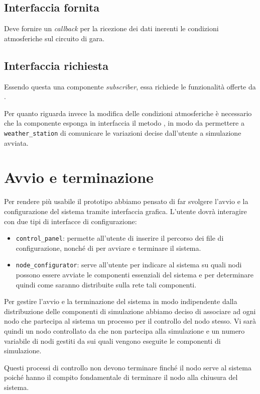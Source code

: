 \subsection*{Interfaccia fornita}
Deve fornire un \textit{callback} per la ricezione dei dati inerenti le condizioni atmosferiche sul circuito di gara.
\subsection*{Interfaccia richiesta}
Essendo questa una componente \textit{subscriber}, essa richiede le funzionalità offerte da .

Per quanto riguarda invece la modifica delle condizioni atmosferiche è necessario che la componente \weather{} esponga in interfaccia il metodo , in modo da permettere a \texttt{weather\_station} di comunicare le variazioni decise dall'utente a simulazione avviata.

\section{Avvio e terminazione}
\label{sec:start-stop}
Per rendere più usabile il prototipo abbiamo pensato di far svolgere l'avvio e la configurazione del sistema tramite interfaccia grafica.
L'utente dovrà interagire con due tipi di interfacce di configurazione:
\begin{itemize}
\item \texttt{control\_panel}: permette all'utente di inserire il percorso dei file di configurazione, nonché di per avviare e terminare il sistema.
\item \texttt{node\_configurator}: serve all'utente per indicare al sistema su quali nodi possono essere avviate le componenti essenziali del sistema e per determinare quindi come saranno distribuite sulla rete tali componenti.
\end{itemize}
Per gestire l'avvio e la terminazione del sistema in modo indipendente dalla distribuzione delle componenti di simulazione abbiamo deciso di associare ad ogni nodo che partecipa al sistema un processo per il controllo del nodo stesso. Vi sarà quindi un nodo controllato da \bootserv{} che non partecipa alla simulazione e un numero variabile di nodi gestiti da \nodeman{} sui quali vengono eseguite le componenti di simulazione.

Questi processi di controllo non devono terminare finché il nodo serve al sistema poiché hanno il compito fondamentale di terminare il nodo \Erlang{} alla chiusura del sistema.

